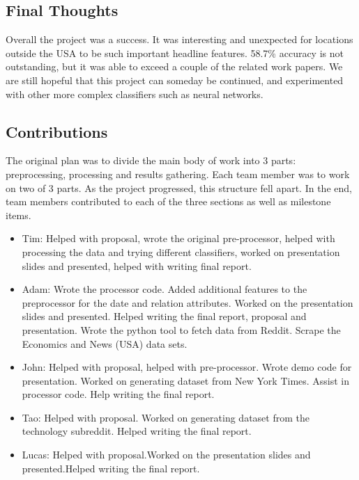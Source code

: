 \documentclass[11pt,a4paper]{article}
\begin{document}
\subsection{Final Thoughts}
Overall the project was a success. It was interesting and unexpected for locations outside the USA to be such important headline features. 58.7\% accuracy is not outstanding, but it was able to exceed a couple of the related work papers. We are still hopeful that this project can someday be continued, and experimented with other more complex classifiers such as neural networks.


\subsection{Contributions}
The original plan was to divide the main body of work into 3 parts: preprocessing, processing and results gathering. Each team member was to work on two of 3 parts. As the project progressed, this structure fell apart. In the end, team members contributed to each of the three sections as well as milestone items.\\

\begin{itemize}
\item Tim: Helped with proposal, wrote the original pre-processor, helped with processing the data and trying different classifiers, worked on presentation slides and presented, helped with writing final report.\\

\item Adam: Wrote the processor code. Added additional features to the preprocessor for the date and relation attributes. Worked on the presentation slides and presented. Helped writing the final report, proposal and presentation. Wrote the python tool to fetch data from Reddit. Scrape the Economics and News (USA) data sets.\\

\item John: Helped with proposal, helped with pre-processor. Wrote demo code for presentation. Worked on generating dataset from New York Times. Assist in processor code. Help writing the final report.\\

\item Tao: Helped with proposal. Worked on generating dataset from the technology subreddit. Helped writing the final report.

\item Lucas: Helped with proposal.Worked on the presentation slides and presented.Helped writing the final report.
\end{itemize}
\end{document}
